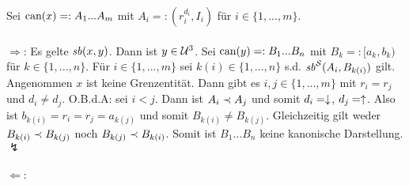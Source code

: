 \begin{bew}
    Sei $\text{can}(x) =: A_1 ... A_m$ mit $A_i =: (r_i^{d_i}, I_i)$ für $i \in \{1, ..., m\}$.\\ \ \\
    $\boldsymbol{\Rightarrow}$: 
    Es gelte $\mathit{sb}(x,y)$.
    Dann ist $y \in \mathcal{U}^3$.
    Sei $\text{can}(y) =: B_1 ... B_n$ mit $B_k =: [a_k,b_k)$ für $k \in \{1, ..., n\}$.
    Für $i \in \{1, ..., m\}$ sei $k(i) \in \{1, ..., n\}$ s.d. $\mathit{sb}^{\mathcal{S}}(A_i,B_{k(i)})$ gilt.
    Angenommen $x$ ist keine Grenzentität.
    Dann gibt es $i,j \in \{1, ..., m\}$ mit $r_i = r_j$ und $d_i \neq d_j$. O.B.d.A: sei $i<j$. Dann ist $A_i \prec A_j$ und somit $d_i = \downarrow$, $d_j = \uparrow$.
    Also ist $b_{k(i)} = r_i = r_j = a_{k(j)}$ und somit $B_{k(i)} \neq B_{k(j)}$. Gleichzeitig gilt weder $B_{k(i)} \prec B_{k(j)}$ noch $B_{k(j)} \prec B_{k(i)}$. 
    Somit ist $B_1 ... B_n$ keine kanonische Darstellung. $\lightning$\\ \ \\
    $\boldsymbol{\Leftarrow}$:
%     

\end{bew}
